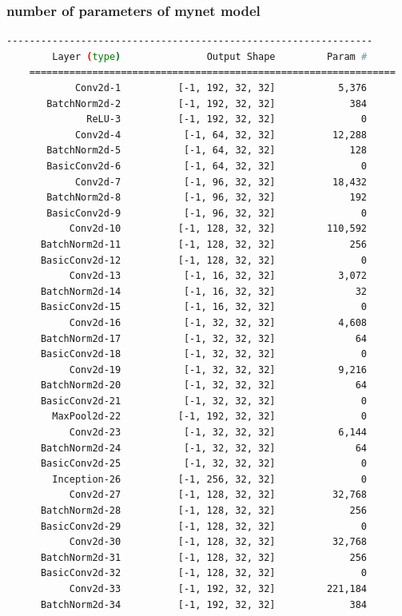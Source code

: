 \documentclass[a4paper, 12pt]{article}
\begin{document}
\subsubsection{number of parameters of mynet model}
\begin{lstlisting}[language=sh]
    ----------------------------------------------------------------
        Layer (type)               Output Shape         Param #
    ================================================================
            Conv2d-1          [-1, 192, 32, 32]           5,376
       BatchNorm2d-2          [-1, 192, 32, 32]             384
              ReLU-3          [-1, 192, 32, 32]               0
            Conv2d-4           [-1, 64, 32, 32]          12,288
       BatchNorm2d-5           [-1, 64, 32, 32]             128
       BasicConv2d-6           [-1, 64, 32, 32]               0
            Conv2d-7           [-1, 96, 32, 32]          18,432
       BatchNorm2d-8           [-1, 96, 32, 32]             192
       BasicConv2d-9           [-1, 96, 32, 32]               0
           Conv2d-10          [-1, 128, 32, 32]         110,592
      BatchNorm2d-11          [-1, 128, 32, 32]             256
      BasicConv2d-12          [-1, 128, 32, 32]               0
           Conv2d-13           [-1, 16, 32, 32]           3,072
      BatchNorm2d-14           [-1, 16, 32, 32]              32
      BasicConv2d-15           [-1, 16, 32, 32]               0
           Conv2d-16           [-1, 32, 32, 32]           4,608
      BatchNorm2d-17           [-1, 32, 32, 32]              64
      BasicConv2d-18           [-1, 32, 32, 32]               0
           Conv2d-19           [-1, 32, 32, 32]           9,216
      BatchNorm2d-20           [-1, 32, 32, 32]              64
      BasicConv2d-21           [-1, 32, 32, 32]               0
        MaxPool2d-22          [-1, 192, 32, 32]               0
           Conv2d-23           [-1, 32, 32, 32]           6,144
      BatchNorm2d-24           [-1, 32, 32, 32]              64
      BasicConv2d-25           [-1, 32, 32, 32]               0
        Inception-26          [-1, 256, 32, 32]               0
           Conv2d-27          [-1, 128, 32, 32]          32,768
      BatchNorm2d-28          [-1, 128, 32, 32]             256
      BasicConv2d-29          [-1, 128, 32, 32]               0
           Conv2d-30          [-1, 128, 32, 32]          32,768
      BatchNorm2d-31          [-1, 128, 32, 32]             256
      BasicConv2d-32          [-1, 128, 32, 32]               0
           Conv2d-33          [-1, 192, 32, 32]         221,184
      BatchNorm2d-34          [-1, 192, 32, 32]             384

\end{lstlisting}
\end{document}
